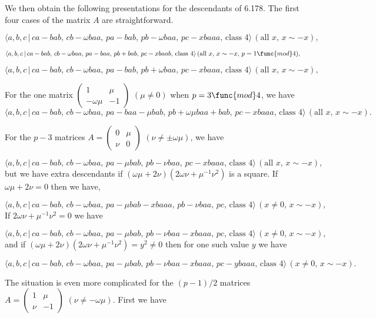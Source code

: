 \documentclass[12pt]{article}
\begin{document}
We then obtain the following presentations for the descendants of 6.178. The
first four cases of the matrix $A$ are straightforward.

\[
\langle a,b,c\,|\,ca-bab,\,cb-\omega baa,\,pa-bab,\,pb-\omega
baa,\,pc-xbaaa,\,\text{class }4\rangle \,(\text{all }x,\,x\sim -x),
\]

\[
\langle a,b,c\,|\,ca-bab,\,cb-\omega baa,\,pa-baa,\,pb+bab,\,pc-xbaab,\,%
\text{class }4\rangle \,(\text{all }x,\,x\sim -x,\,p=1\func{mod}4),
\]

\[
\langle a,b,c\,|\,ca-bab,\,cb-\omega baa,\,pa-bab,\,pb+\omega
baa,\,pc-xbaaa,\,\text{class }4\rangle \,(\text{all }x,\,x\sim -x),
\]

For the one matrix $\left( 
\begin{array}{ll}
1 & \mu  \\ 
-\omega \mu  & -1%
\end{array}%
\right) $ $(\mu \neq 0)$ when $p=3\func{mod}4$, we have 
\[
\langle a,b,c\,|\,ca-bab,\,cb-\omega baa,\,pa-baa-\mu bab,\,pb+\omega \mu
baa+bab,\,pc-xbaaa,\,\text{class }4\rangle \,(\text{all }x,\,x\sim -x).
\]

For the $p-3$ matrices $A=\left( 
\begin{array}{ll}
0 & \mu \\ 
\nu & 0%
\end{array}%
\right) $ $(\nu \neq \pm \omega \mu )$, we have

\[
\langle a,b,c\,|\,ca-bab,\,cb-\omega baa,\,pa-\mu bab,\,pb-\nu
baa,\,pc-xbaaa,\,\text{class }4\rangle \,(\text{all }x,\,x\sim -x),
\]%
but we have extra descendants if $(\omega \mu +2\nu )(2\omega \nu +\mu
^{-1}\nu ^{2})$ is a square. If $\omega \mu +2\nu =0$ then we have,

\[
\langle a,b,c\,|\,ca-bab,\,cb-\omega baa,\,pa-\mu bab-xbaaa,\,pb-\nu
baa,\,pc,\,\text{class }4\rangle \,(x\neq 0,\,x\sim -x),
\]%
If $2\omega \nu +\mu ^{-1}\nu ^{2}=0$ we have

\[
\langle a,b,c\,|\,ca-bab,\,cb-\omega baa,\,pa-\mu bab,\,pb-\nu
baa-xbaaa,\,pc,\,\text{class }4\rangle \,(x\neq 0,\,x\sim -x),
\]%
and if $(\omega \mu +2\nu )(2\omega \nu +\mu ^{-1}\nu ^{2})=y^{2}\neq 0$
then for one such value $y$ we have

\[
\langle a,b,c\,|\,ca-bab,\,cb-\omega baa,\,pa-\mu bab,\,pb-\nu
baa-xbaaa,\,pc-ybaaa,\,\text{class }4\rangle \,(x\neq 0,\,x\sim -x).
\]

The situation is even more complicated for the $(p-1)/2$ matrices $A=\left( 
\begin{array}{ll}
1 & \mu \\ 
\nu & -1%
\end{array}%
\right) $ $(\nu \neq -\omega \mu )$. First we have
\end{document}
